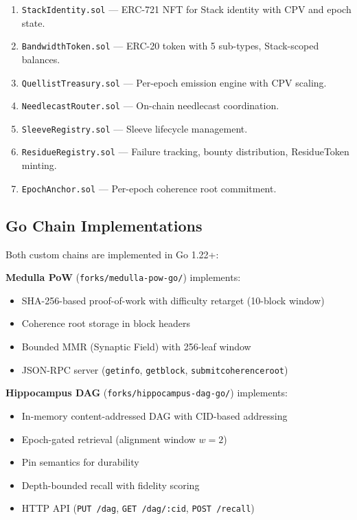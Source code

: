 \documentclass[11pt,twocolumn]{article}
\theoremstyle{definition}
\theoremstyle{plain}
\theoremstyle{remark}
\begin{document}
\begin{enumerate}[leftmargin=*,itemsep=1pt]
  \item \texttt{StackIdentity.sol} --- ERC-721 NFT for Stack identity with CPV and epoch state.
  \item \texttt{BandwidthToken.sol} --- ERC-20 token with 5 sub-types, Stack-scoped balances.
  \item \texttt{QuellistTreasury.sol} --- Per-epoch emission engine with CPV scaling.
  \item \texttt{NeedlecastRouter.sol} --- On-chain needlecast coordination.
  \item \texttt{SleeveRegistry.sol} --- Sleeve lifecycle management.
  \item \texttt{ResidueRegistry.sol} --- Failure tracking, bounty distribution, ResidueToken minting.
  \item \texttt{EpochAnchor.sol} --- Per-epoch coherence root commitment.
\end{enumerate}

\subsection{Go Chain Implementations}

Both custom chains are implemented in Go 1.22+:

\textbf{Medulla PoW} (\texttt{forks/medulla-pow-go/}) implements:
\begin{itemize}[leftmargin=*,itemsep=1pt]
  \item SHA-256-based proof-of-work with difficulty retarget (10-block window)
  \item Coherence root storage in block headers
  \item Bounded MMR (Synaptic Field) with 256-leaf window
  \item JSON-RPC server (\texttt{getinfo}, \texttt{getblock}, \texttt{submitcoherenceroot})
\end{itemize}

\textbf{Hippocampus DAG} (\texttt{forks/hippocampus-dag-go/}) implements:
\begin{itemize}[leftmargin=*,itemsep=1pt]
  \item In-memory content-addressed DAG with CID-based addressing
  \item Epoch-gated retrieval (alignment window $w = 2$)
  \item Pin semantics for durability
  \item Depth-bounded recall with fidelity scoring
  \item HTTP API (\texttt{PUT /dag}, \texttt{GET /dag/:cid}, \texttt{POST /recall})
\end{itemize}
\end{document}

